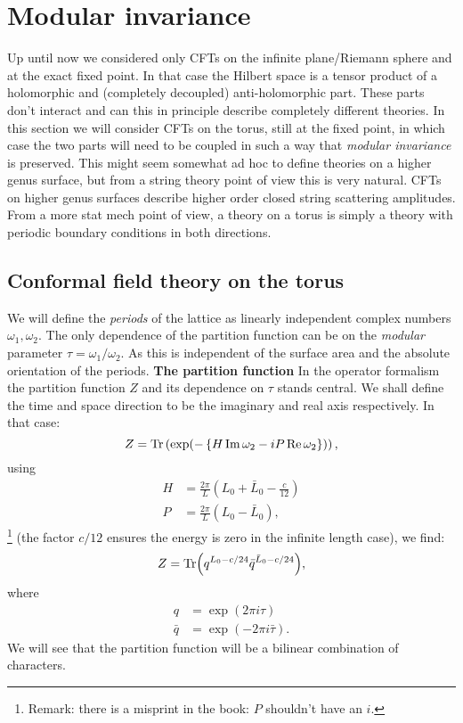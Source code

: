 \documentclass[submission, PhysLectNotes]{SciPost}
\begin{document}
\section{Modular invariance}
Up until now we considered only CFTs on the infinite plane/Riemann sphere and at the exact fixed point. In that case the Hilbert space is a tensor product of a holomorphic and (completely decoupled) anti-holomorphic part. These parts don't interact and can this in principle describe completely different theories. In this section we will consider CFTs on the torus, still at the fixed point, in which case the two parts will need to be coupled in such a way that \emph{modular invariance} is preserved. This might seem somewhat ad hoc to define theories on a higher genus surface, but from a string theory point of view this is very natural. CFTs on higher genus surfaces describe higher order closed string scattering amplitudes. From a more stat mech point of view, a theory on a torus is simply a theory with periodic boundary conditions in both directions.
\subsection{Conformal field theory on the torus}
We will define the \emph{periods} of the lattice as linearly independent complex numbers $\omega_1,\omega_2$. The only dependence of the partition function can be on the \emph{modular} parameter $\tau=\omega_1/\omega_2$. As this is independent of the surface area and the absolute orientation of the periods.
{\bf The partition function}
In the operator formalism the partition function $Z$ and its dependence on $\tau$ stands central. We shall define the time and space direction to be the imaginary and real axis respectively. In that case:
\begin{equation}
	Z=\Tr\left(\exp(-\left\{H\Im\omega_2-iP\Re\omega_2\right\})\right),
\end{equation}
using
\begin{align}
	H &=  \frac{2\pi}{L}\left(L_0 + \bar L_0 -\frac{c}{12}\right)\\
	P &=  \frac{2\pi}{L}\left(L_0 - \bar L_0\right),
\end{align}
\footnote{{\color{red}Remark:} there is a misprint in the book: $P$ shouldn't have an $i$.} (the factor $c/12$ ensures the energy is zero in the infinite length case), we find:
\begin{equation}
	Z = \Tr(q^{L_0 - c/24}\bar q^{\bar L_0 -c/24}),
\end{equation}
where
\begin{align}
	q &= \exp(2\pi i\tau)\\
	\bar q &= \exp(-2\pi i\bar \tau).
\end{align}
We will see that the partition function will be a bilinear combination of characters.
\end{document}
